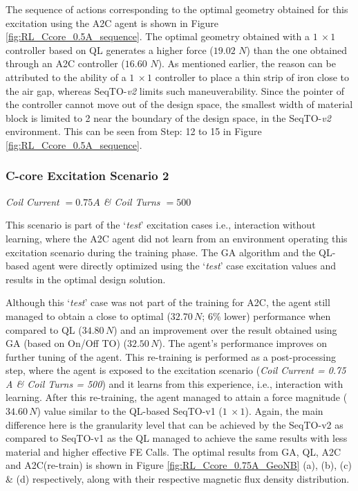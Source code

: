 The sequence of actions corresponding to the optimal geometry obtained for this excitation using the A2C agent is shown in Figure \ref{fig:RL_Ccore_0.5A_sequence}. The optimal geometry obtained with a $1\ \times 1$ controller based on QL generates a higher force ($19.02 \hspace{2pt} \hspace{2pt} N$) than the one obtained through an A2C controller ($16.60 \hspace{2pt} \hspace{2pt} N$). As mentioned earlier, the reason can be attributed to the ability of a $1\ \times 1$ controller to place a thin strip of iron close to the air gap, whereas SeqTO-\textit{v2} limits such maneuverability. Since the pointer of the controller cannot move out of the design space, the smallest width of material block is limited to 2 near the boundary of the design space, in the SeqTO-\textit{v2} environment. This can be seen from Step: 12 to 15 in Figure \ref{fig:RL_Ccore_0.5A_sequence}.  

\clearpage
\newpage

\subsubsection{C-core Excitation Scenario 2}
\textit{Coil Current $= 0.75 A$  \& Coil Turns $= 500$}

This scenario is part of the `\textit{test}’ excitation cases i.e., interaction without learning, where the A2C agent did not learn from an environment operating this excitation scenario during the training phase. The GA algorithm and the QL-based agent were directly optimized using the `\textit{test}' case excitation values and results in the optimal design solution. 

Although this `\textit{test}' case was not part of the training for A2C, the agent still managed to obtain a close to optimal ($32.70 \hspace{2pt} N$; $ 6\% $ lower) performance when compared to QL ($34.80 \hspace{2pt} N$) and an improvement over the result obtained using GA (based on On/Off TO) ($32.50 \hspace{2pt} N$). The agent’s performance improves on further tuning of the agent. This re-training is performed as a post-processing step, where the agent is exposed to the excitation scenario (\textit{Coil Current = 0.75 A \& Coil Turns = 500}) and it learns from this experience, i.e., interaction with learning. After this re-training, the agent managed to attain a force magnitude ($34.60 \hspace{2pt} N$) value similar to the QL-based SeqTO-v1 ($1\ \times 1$). Again, the main difference here is the granularity level that can be achieved by the SeqTO-v2 as compared to SeqTO-v1 as the QL managed to achieve the same results with less material and higher effective FE Calls. The optimal results from GA, QL, A2C and A2C(re-train) is shown in Figure \ref{fig:RL_Ccore_0.75A_GeoNB} (a), (b), (c) & (d) respectively, along with their respective magnetic flux density distribution.

